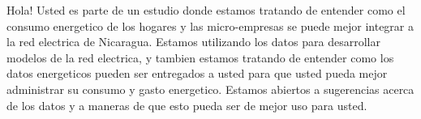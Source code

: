 \documentclass{article}\usepackage[]{graphicx}\usepackage[]{color}
\newenvironment{knitrout}{}{} %
\begin{document}
%




%




%



%

\vspace{70px}
\begin{knitrout}
Hola! Usted es parte de un estudio donde estamos tratando de entender como el consumo energetico de los hogares y las micro-empresas se puede mejor integrar a la red electrica de Nicaragua. Estamos utilizando los datos para desarrollar modelos de la red electrica, y tambien estamos tratando de entender como los datos energeticos pueden ser entregados a usted para que usted pueda mejor administrar su consumo y gasto energetico.  Estamos abiertos a sugerencias acerca de los datos y a maneras de que esto pueda ser de mejor uso para usted.
\end{knitrout}
\end{document}
